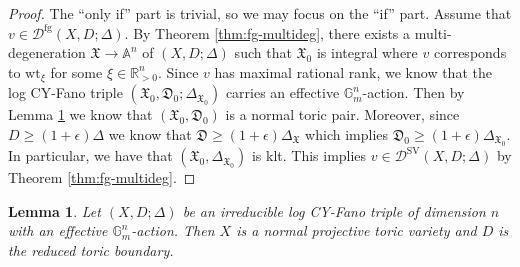 \documentclass[reqno, 12pt]{amsart}
\newtheorem{lem}[prop]{Lemma}
\theoremstyle{definition}
\newcommand{\bR}{\mathbb{R}}
\newcommand{\bA}{\mathbb{A}}
\newcommand{\bG}{\mathbb{G}}
\newcommand{\cD}{\mathcal{D}}
\newcommand{\wt}{\mathrm{wt}}
\newcommand{\fX}{\mathfrak{X}}
\newcommand{\fD}{\mathfrak{D}}
\newcommand{\SV}{\mathrm{SV}}
\newcommand{\rfg}{\mathrm{fg}}
\numberwithin{equation}{section}
\begin{document}
\begin{proof}
The ``only if'' part is trivial, so we may focus on the ``if'' part. Assume that $v\in \cD^{\rfg}(X,D;\Delta)$. By Theorem \ref{thm:fg-multideg}, there exists a multi-degeneration $\fX\to \bA^n$ of $(X,D;\Delta)$ such that $\fX_0$ is integral where $v$ corresponds to $\wt_{\xi}$ for some $\xi\in \bR_{>0}^n$. Since $v$ has maximal rational rank, we know that the log CY-Fano triple $(\fX_0, \fD_0;\Delta_{\fX_0})$ carries an effective $\bG_m^n$-action. Then by Lemma \ref{lem:toric} we know that $(\fX_0, \fD_0)$
 is a normal toric pair. Moreover, since $D\geq (1+\epsilon)\Delta$ we know that $\fD\geq (1+\epsilon)\Delta_{\fX}$ which implies $\fD_0\geq (1+\epsilon)\Delta_{\fX_0}$. In particular, we have that $(\fX_0, \Delta_{\fX_0})$ is klt. This implies $v\in \cD^{\SV}(X,D;\Delta)$ by Theorem \ref{thm:fg-multideg}.
\end{proof}

\begin{lem}\label{lem:toric}
Let $(X,D;\Delta)$ be an irreducible log CY-Fano triple of dimension $n$ with an effective $\bG_m^n$-action. Then $X$ is a normal projective toric variety and $D$ is the reduced toric boundary.
\end{lem}
\end{document}
